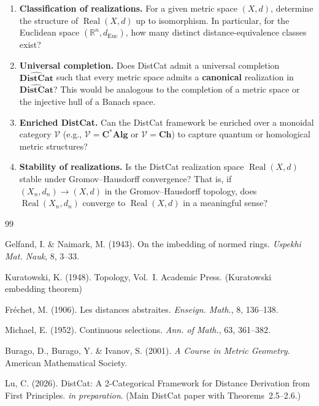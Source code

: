 \documentclass[11pt,a4paper]{article}
\begin{document}
\begin{enumerate}
\item \textbf{Classification of realizations.} For a given metric space
$(X,d)$, determine the structure of $\operatorname{Real}(X,d)$ up to
isomorphism. In particular, for the Euclidean space $(\mathbb{R}^n,d_{\mathrm{Euc}})$,
how many distinct distance-equivalence classes exist?
\item \textbf{Universal completion.} Does DistCat admit a universal
completion $\widehat{\mathbf{DistCat}}$ such that every metric space admits a
\textbf{canonical} realization in $\widehat{\mathbf{DistCat}}$? This would be
analogous to the completion of a metric space or the injective hull of a
Banach space.
\item \textbf{Enriched DistCat.} Can the DistCat framework be enriched over
a monoidal category $\mathcal{V}$ (e.g., $\mathcal{V}=\mathbf{C^*Alg}$ or
$\mathcal{V}=\mathbf{Ch}$) to capture quantum or homological metric
structures?
\item \textbf{Stability of realizations.} Is the DistCat realization space
$\operatorname{Real}(X,d)$ stable under Gromov--Hausdorff convergence? That is,
if $(X_n,d_n)\to(X,d)$ in the Gromov--Hausdorff topology, does
$\operatorname{Real}(X_n,d_n)$ converge to $\operatorname{Real}(X,d)$ in a
meaningful sense?
\end{enumerate}

\begin{thebibliography}{99}

Gelfand, I. \& Naimark, M. (1943). On the imbedding of normed rings.
\textit{Uspekhi Mat. Nauk}, 8, 3--33.

Kuratowski, K. (1948). Topology, Vol.~I.
Academic Press. (Kuratowski embedding theorem)

Fr\'echet, M. (1906). Les distances abstraites.
\textit{Enseign. Math.}, 8, 136--138.

Michael, E. (1952). Continuous selections.
\textit{Ann. of Math.}, 63, 361--382.

Burago, D., Burago, Y. \& Ivanov, S. (2001).
\textit{A Course in Metric Geometry}.
American Mathematical Society.

Lu, C. (2026). DistCat: A 2-Categorical Framework for Distance Derivation
from First Principles. \textit{in preparation}.
(Main DistCat paper with Theorems~2.5--2.6.)

\end{thebibliography}
\end{document}
